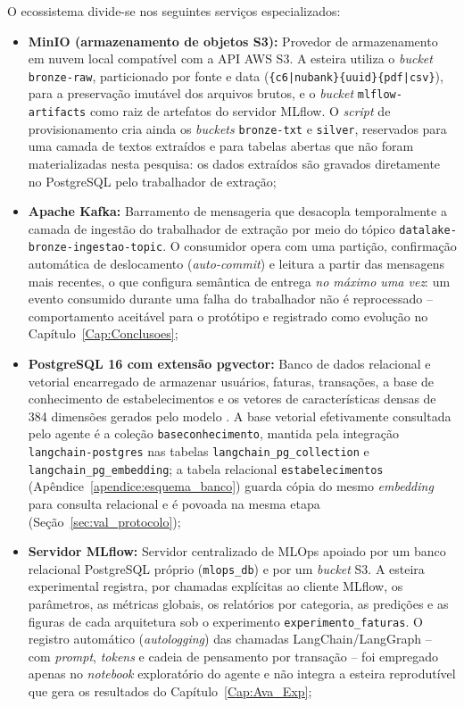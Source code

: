 O ecossistema divide-se nos seguintes serviços especializados:
\begin{itemize}
	\item \textbf{MinIO (armazenamento de objetos S3):} Provedor de armazenamento em nuvem local compatível com a API AWS S3. A esteira utiliza o \textit{bucket} \texttt{bronze-raw}, particionado por fonte e data (\texttt{\{c6|nubank\}}\allowbreak{}\allowbreak\texttt{\{uuid\}}\allowbreak{}\texttt{\{pdf|csv\}}), para a preservação imutável dos arquivos brutos, e o \textit{bucket} \texttt{mlflow-artifacts} como raiz de artefatos do servidor MLflow. O \textit{script} de provisionamento cria ainda os \textit{buckets} \texttt{bronze-txt} e \texttt{silver}, reservados para uma camada de textos extraídos e para tabelas abertas que não foram materializadas nesta pesquisa: os dados extraídos são gravados diretamente no PostgreSQL pelo trabalhador de extração;
	\item \textbf{Apache Kafka:} Barramento de mensageria que desacopla temporalmente a camada de ingestão do trabalhador de extração por meio do tópico \texttt{datalake-\allowbreak bronze-\allowbreak ingestao-\allowbreak topic}. O consumidor opera com uma partição, confirmação automática de deslocamento (\textit{auto-commit}) e leitura a partir das mensagens mais recentes, o que configura semântica de entrega \textit{no máximo uma vez}: um evento consumido durante uma falha do trabalhador não é reprocessado -- comportamento aceitável para o protótipo e registrado como evolução no Capítulo~\ref{Cap:Conclusoes};
	\item \textbf{PostgreSQL 16 com extensão pgvector:} Banco de dados relacional e vetorial encarregado de armazenar usuários, faturas, transações, a base de conhecimento de estabelecimentos e os vetores de características densas de 384 dimensões gerados pelo modelo \modelemb{}. A base vetorial efetivamente consultada pelo agente é a coleção \texttt{baseconhecimento}, mantida pela integração \texttt{langchain-postgres} nas tabelas \texttt{langchain\_pg\_collection} e \texttt{langchain\_pg\_embedding}; a tabela relacional \texttt{estabelecimentos} (Apêndice~\ref{apendice:esquema_banco}) guarda cópia do mesmo \textit{embedding} para consulta relacional e é povoada na mesma etapa (Seção~\ref{sec:val_protocolo});
	\item \textbf{Servidor MLflow:} Servidor centralizado de MLOps apoiado por um banco relacional PostgreSQL próprio (\texttt{mlops\_db}) e por um \textit{bucket} S3. A esteira experimental registra, por chamadas explícitas ao cliente MLflow, os parâmetros, as métricas globais, os relatórios por categoria, as predições e as figuras de cada arquitetura sob o experimento \texttt{experimento\_faturas}. O registro automático (\textit{autologging}) das chamadas LangChain/LangGraph -- com \textit{prompt}, \textit{tokens} e cadeia de pensamento por transação -- foi empregado apenas no \textit{notebook} exploratório do agente e não integra a esteira reprodutível que gera os resultados do Capítulo~\ref{Cap:Ava_Exp};

\end{itemize}
